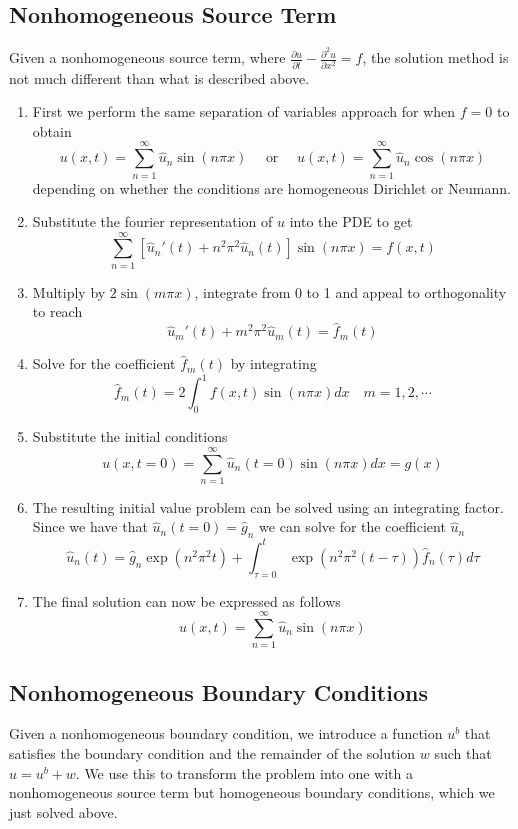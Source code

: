 \documentclass[11pt]{article}
\begin{document}
\subsection{Nonhomogeneous Source Term}
Given a nonhomogeneous source term, where $\frac{\partial u}{\partial t} - \frac{\partial ^2 u}{\partial x^2} = f$, the solution method is not much different than  what is described above. 
\begin{enumerate}
\item First we perform the same separation of variables approach for when $f=0$ to obtain 
$$ u(x,t) = \sum_{n=1}^{\infty} \hat{u}_n \sin (n\pi x ) \quad \text{ or } \quad u(x,t) = \sum_{n=1}^{\infty} \hat{u}_n \cos (n\pi x ) $$
depending on whether the conditions are homogeneous Dirichlet or Neumann.
\item Substitute the fourier representation of $u$ into the PDE to get
$$\sum_{n=1}^{\infty}  [\hat{u}_n'(t) + n^2 \pi^2  \hat{u}_n(t)] \sin (n\pi x ) = f(x,t)$$
\item Multiply by $2 \sin (m \pi x)$, integrate from 0 to 1 and appeal to orthogonality to reach
$$ \hat{u}_m'(t) + m^2 \pi^2  \hat{u}_m(t)  = \hat{f}_m(t)$$
\item Solve for the coefficient $\hat{f}_m(t)$ by integrating
$$ \hat{f}_m (t) = 2 \int_0^1 f(x,t) \sin (n \pi x) dx \quad m=1,2, \cdots  $$ 
\item Substitute the initial conditions
$$ u(x, t=0) = \sum_{n=1}^{\infty} \hat{u}_n (t=0) \sin (n\pi x) dx = g(x)$$
\item The resulting initial value problem can be solved using an integrating factor. Since we have that $\hat{u}_n(t=0) = \hat{g}_n$ we can solve for the coefficient $\hat{u}_n$
$$ \hat{u}_n (t) = \hat{g}_n \exp (n^2 \pi^2 t ) + \int_{\tau =0}^{t} \exp (n^2 \pi^2 (t- \tau) ) \hat{f}_n(\tau) d \tau $$
\item The final solution can now be expressed as follows
$$ u(x,t) = \sum_{n=1}^{\infty} \hat{u}_n \sin (n\pi x ) $$


\end{enumerate}

\subsection{Nonhomogeneous Boundary Conditions}
Given a nonhomogeneous boundary condition, we  introduce a function $u^b$ that satisfies the boundary condition and the remainder of the solution $w$ such that $u = u^b +w$. We use this to transform the problem into one with a nonhomogeneous source term but homogeneous boundary conditions, which we just solved above.
\end{document}
